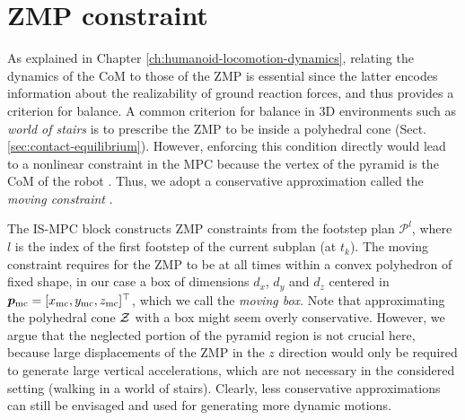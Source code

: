 \section{ZMP constraint}
As explained in Chapter \ref{ch:humanoid-locomotion-dynamics},
relating the dynamics of the CoM to those of the ZMP is essential since the
latter encodes information about the realizability of ground reaction forces,
and thus provides a criterion for balance. A common criterion for balance
in 3D environments such as \textit{world of stairs}
is to prescribe the ZMP to be inside a polyhedral cone
(Sect. \ref{sec:contact-equilibrium}). However, enforcing this condition
directly would lead to a nonlinear constraint
in the MPC because the vertex of the pyramid is the CoM of the robot
\cite{Caron2017DynamicWalkingOverRoughTerrains}.
Thus, we adopt a conservative approximation called the \textit{moving constraint}
\cite{Aboudonia2017Humanoids}.

The IS-MPC block constructs ZMP constraints from the footstep plan
$\mathcal{P}^l$, where $l$ is the index of the first footstep of the current
subplan (at $t_k$). The moving constraint requires for the ZMP to be at all
times within a convex
polyhedron of fixed shape, in our case a box of dimensions $d_x$, $d_y$ and
$d_z$ centered in ${\bm{p}}_{\rm mc}=[x_{\rm mc}, y_{\rm mc}, z_{\rm mc}]^\top$,
which we call the \textit{moving box}. Note that approximating the polyhedral cone
$\cal Z$ with a box might seem overly conservative. However, we argue that the
neglected portion of the pyramid region is not crucial here, because large
displacements of the ZMP in the $z$ direction would only be required to generate
large vertical accelerations, which are not necessary in the considered setting
(walking in a world of stairs). Clearly, less conservative approximations can
still be envisaged and used for generating more dynamic motions.

